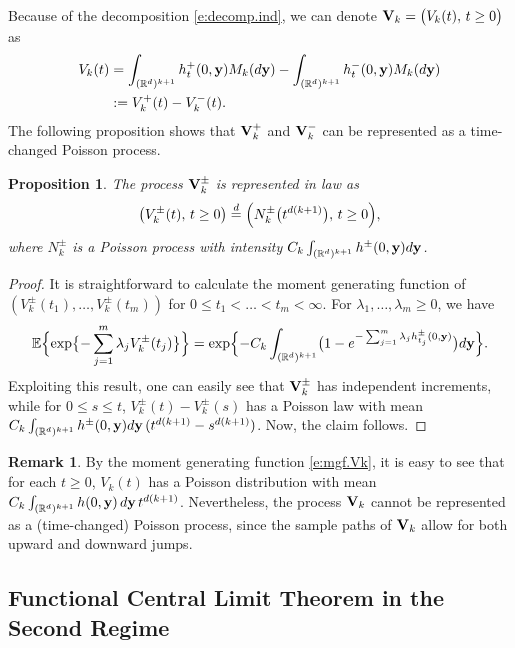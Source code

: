 \documentclass[11pt]{amsart}
\numberwithin{equation}{section}
\theoremstyle{plain}
\newtheorem{proposition}[theorem]{Proposition}
\theoremstyle{definition}
\newtheorem{remark}[theorem]{Remark}
\begin{document}
Because of the decomposition \eqref{e:decomp.ind}, we can denote ${{\bf V}}_k = \bigl( V_k(t), \, t\geq 0 \bigr)$ as
\begin{align*}
V_k(t) &= \int_{({{\mathbb R}}^d)^{k+1}} h_t^+(0,{{\bf y}}) M_k(d{{\bf y}}) - \int_{({{\mathbb R}}^d)^{k+1}} h_t^-(0,{{\bf y}}) M_k(d{{\bf y}}) \\
&:= V_k^+(t) - V_k^-(t).
\end{align*}
The following proposition shows that ${{\bf V}}_k^+$ and ${{\bf V}}_k^-$ can be represented as a time-changed Poisson process.
\begin{proposition}  \label{p:diff.poisson}
The process ${{\bf V}}_k^{\pm}$ is represented in law as
$$
\bigl( V_k^{\pm}(t), \, t\geq 0 \bigr) \stackrel{d}{=} \Bigl( N_k^{\pm}\bigl( t^{d(k+1)} \bigr), \, t\geq 0 \Bigr),
$$
where $N_k^{\pm}$ is a Poisson process with intensity $C_k\int_{({{\mathbb R}}^d)^{k+1}} h^{\pm}(0,{{\bf y}}) d{{\bf y}}$.
\end{proposition}
\begin{proof}
It is straightforward to calculate the moment generating function of $(V_k^{\pm}(t_1), \dots, V_k^{\pm}(t_m))$ for $0 \leq t_1 < \dots < t_m <\infty$. For $\lambda_1, \dots, \lambda_m \geq 0$, we have
\begin{equation}  \label{e:mgf.Vk}
{\mathbb{E}} \Bigl\{ \exp \bigl\{ -\sum_{j=1}^m \lambda_j V_k^{\pm}(t_j) \bigr\} \Bigr\} = \exp \Bigl\{ -C_k \int_{({{\mathbb R}}^d)^{k+1}} \bigl( 1-e^{-\sum_{j=1}^m \lambda_j h_{t_j}^{\pm}(0,{{\bf y}})} \bigr)d{{\bf y}} \Bigr\}.
\end{equation}
Exploiting this result, one can easily see that ${{\bf V}}_k^{\pm}$ has independent increments, while for $0\leq s \leq t$, $V_k^{\pm}(t) - V_k^{\pm}(s)$ has a Poisson law with mean $C_k\int_{({{\mathbb R}}^d)^{k+1}} h^{\pm}(0,{{\bf y}}) d{{\bf y}}\, (t^{d(k+1)}-s^{d(k+1)})$. Now, the claim follows.
\end{proof}
\begin{remark}
By the moment generating function \eqref{e:mgf.Vk}, it is easy to see that for each $t\geq0$, $V_k(t)$ has a Poisson distribution with mean $C_k \int_{({{\mathbb R}}^d)^{k+1}} h(0,{{\bf y}})\, d{{\bf y}}\, t^{d(k+1)}$. Nevertheless, the process ${{\bf V}}_k$ cannot be represented as a (time-changed) Poisson process, since the sample paths of ${{\bf V}}_k$ allow for both upward and downward jumps.
\end{remark}

\subsection{Functional Central Limit Theorem in the Second Regime}
 \label{s:second.regime}
\end{document}

